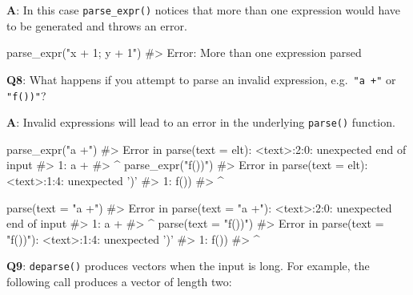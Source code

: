 \documentclass[
]{krantz}
\makeatletter
\newenvironment{Shaded}{\begin{snugshade}}{\end{snugshade}}
\newcommand{\CommentTok}[1]{\textcolor[rgb]{0.56,0.35,0.01}{\textit{#1}}}
\newcommand{\DataTypeTok}[1]{\textcolor[rgb]{0.13,0.29,0.53}{#1}}
\newcommand{\KeywordTok}[1]{\textcolor[rgb]{0.13,0.29,0.53}{\textbf{#1}}}
\newcommand{\NormalTok}[1]{#1}
\newcommand{\StringTok}[1]{\textcolor[rgb]{0.31,0.60,0.02}{#1}}
\newenvironment{kframe}{%
\medskip{}
\setlength{\fboxsep}{.8em}
 \def\at@end@of@kframe{}%
 \ifinner\ifhmode%
  \def\at@end@of@kframe{\end{minipage}}%
  \begin{minipage}{\columnwidth}%
 \fi\fi%
 \def\FrameCommand##1{\hskip\@totalleftmargin \hskip-\fboxsep
 \colorbox{shadecolor}{##1}\hskip-\fboxsep
     \hskip-\linewidth \hskip-\@totalleftmargin \hskip\columnwidth}%
 \MakeFramed {\advance\hsize-\width
   \@totalleftmargin\z@ \linewidth\hsize
   \@setminipage}}%
 {\par\unskip\endMakeFramed%
 \at@end@of@kframe}
\renewenvironment{Shaded}{\begin{kframe}}{\end{kframe}}
\renewcommand{\KeywordTok} [1]{\textcolor[rgb]{0.00,0.44,0.13}{{#1}}}
\renewcommand{\DataTypeTok}[1]{\textcolor[rgb]{0.56,0.13,0.00}{{#1}}}
\renewcommand{\StringTok}  [1]{\textcolor[rgb]{0.25,0.44,0.63}{{#1}}}
\renewcommand{\CommentTok} [1]{\textcolor[rgb]{0.38,0.63,0.69}{{#1}}}
\renewcommand{\NormalTok}  [1]{{#1}}
\makeatother
\begin{document}
\textbf{{A}}: In this case \texttt{parse\_expr()} notices that more than one expression would have to be generated and throws an error.

\begin{Shaded}
\begin{Highlighting}[]
\KeywordTok{parse_expr}\NormalTok{(}\StringTok{"x + 1; y + 1"}\NormalTok{)}
\CommentTok{#> Error: More than one expression parsed}
\end{Highlighting}
\end{Shaded}

\textbf{{Q8}}: What happens if you attempt to parse an invalid expression, e.g.~\texttt{"a\ +"} or \texttt{"f())"}?

\textbf{{A}}: Invalid expressions will lead to an error in the underlying \texttt{parse()} function.

\begin{Shaded}
\begin{Highlighting}[]
\KeywordTok{parse_expr}\NormalTok{(}\StringTok{"a +"}\NormalTok{)}
\CommentTok{#> Error in parse(text = elt): <text>:2:0: unexpected end of input}
\CommentTok{#> 1: a +}
\CommentTok{#> ^}
\KeywordTok{parse_expr}\NormalTok{(}\StringTok{"f())"}\NormalTok{)}
\CommentTok{#> Error in parse(text = elt): <text>:1:4: unexpected ')'}
\CommentTok{#> 1: f())}
\CommentTok{#> ^}

\KeywordTok{parse}\NormalTok{(}\DataTypeTok{text =} \StringTok{"a +"}\NormalTok{)}
\CommentTok{#> Error in parse(text = "a +"): <text>:2:0: unexpected end of input}
\CommentTok{#> 1: a +}
\CommentTok{#> ^}
\KeywordTok{parse}\NormalTok{(}\DataTypeTok{text =} \StringTok{"f())"}\NormalTok{)}
\CommentTok{#> Error in parse(text = "f())"): <text>:1:4: unexpected ')'}
\CommentTok{#> 1: f())}
\CommentTok{#> ^}
\end{Highlighting}
\end{Shaded}

\textbf{{Q9}}: \texttt{deparse()} produces vectors when the input is long. For example, the following call produces a vector of length two:
\end{document}
